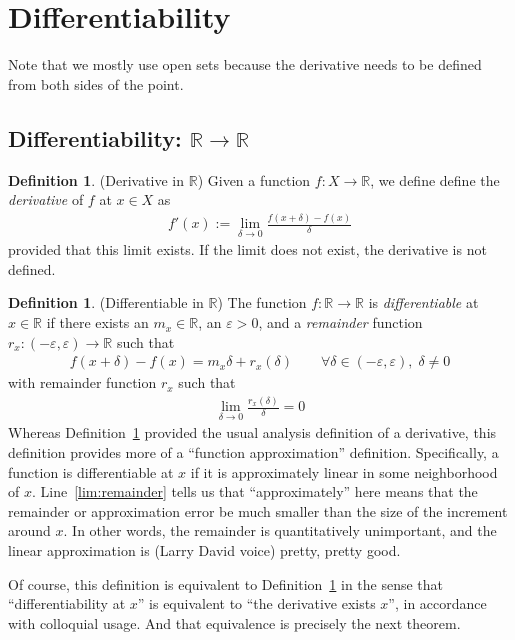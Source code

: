 \documentclass[12pt]{article}
\numberwithin{equation}{section} %
\theoremstyle{plain}
\theoremstyle{definition}
\newtheorem{defn}[thm]{Definition}
\theoremstyle{remark}
\newcommand{\R}{\mathbb{R}}
\begin{document}
\clearpage
\section{Differentiability}

Note that we mostly use open sets because the derivative needs to be
defined from both sides of the point.

\subsection{Differentiability: $\R\rightarrow\R$}

\begin{defn}{(Derivative in $\R$)}
\label{defn:derivative}
Given a function $f:X\rightarrow\R$, we define define the
\emph{derivative} of $f$ at $x\in X$ as
\begin{align*}
  f'(x) := \lim_{\delta\rightarrow0}
  \frac{f(x+\delta)-f(x)}{\delta}
\end{align*}
provided that this limit exists. If the limit does not exist, the
derivative is not defined.
\end{defn}

\begin{defn}{(Differentiable in $\R$)}
\label{defn:diffable}
The function $f:\R\rightarrow\R$ is \emph{differentiable} at $x\in\R$ if
there exists an $m_x\in\R$, an $\varepsilon>0$, and a \emph{remainder}
function $r_x:(-\varepsilon,\varepsilon)\rightarrow\R$ such that
\begin{align}
  \label{eq:diffapprox}
  f(x+\delta)-f(x) = m_x \delta + r_x(\delta)
  \qquad \forall \delta\in(-\varepsilon,\varepsilon), \; \delta \neq 0
\end{align}
with remainder function $r_x$ such that
\begin{align}
  \label{lim:remainder}
  \lim_{\delta\rightarrow 0}
  \frac{r_x(\delta)}{\delta}=0
\end{align}
Whereas Definition~\ref{defn:derivative} provided the usual analysis
definition of a derivative, this definition provides more of a
``function approximation'' definition. Specifically, a function is
differentiable at $x$ if it is approximately linear in some neighborhood
of $x$.  Line~\ref{lim:remainder} tells us that ``approximately'' here
means that the remainder or approximation error be much smaller than
the size of the increment around $x$. In other words, the remainder is
quantitatively unimportant, and the linear approximation is (Larry David
voice) pretty, pretty good.

Of course, this definition is equivalent to
Definition~\ref{defn:derivative} in the sense that ``differentiability
at $x$'' is equivalent to ``the derivative exists $x$'', in accordance
with colloquial usage. And that equivalence is precisely the next
theorem.
\end{defn}
\end{document}
